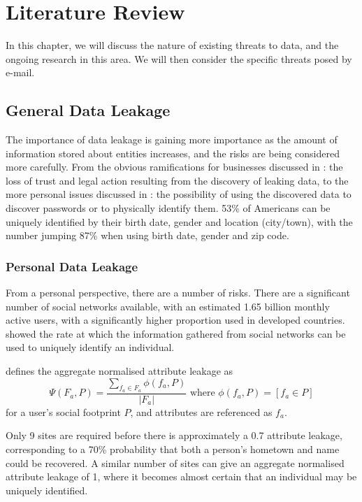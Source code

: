 \chapter{Literature Review}\label{chap:exres}

In this chapter, we will discuss the nature of existing threats to data, and
the ongoing research in this area.  We will then consider the specific threats
posed by e-mail.

\section{General Data Leakage}

The importance of data leakage is gaining more importance as the amount of
information stored about entities increases, and the risks are being considered
more carefully.  From the obvious ramifications for businesses discussed in
\cite{papadimitriou2011data}: the loss of trust and legal action resulting from
the discovery of leaking data, to the more personal issues discussed in
\cite{irani2011modeling}: the possibility of using the discovered data to
discover passwords or to physically identify them.  53\% of Americans can be
uniquely identified by their birth date, gender and location (city/town), with
the number jumping 87\% when using birth date, gender and zip code.

\subsection{Personal Data Leakage}

From a personal perspective, there are a number of risks.  There are a
significant number of social networks available, with an estimated 1.65 billion
monthly active users, with a significantly higher proportion used in developed
countries.  \cite{irani2011modeling} showed the rate at which the information
gathered from social networks can be used to uniquely identify an individual.

\cite{irani2011modeling} defines the aggregate normalised attribute leakage as 
\[\Psi(F_a,P)=\frac{\sum_{f_a\in F_a}\phi\left(f_a, P\right)}{|F_a|}
\text{ where }\phi\left(f_a, P\right) = \left[f_a\in P\right]\]
for a user's social footprint $P$, and attributes are referenced as $f_a$.

Only 9 sites are required before there is approximately a 0.7 attribute
leakage, corresponding to a 70\% probability that both a person's hometown and
name could be recovered.  A similar number of sites can give an aggregate
normalised attribute leakage of 1, where it becomes almost certain that an
individual may be uniquely identified.

